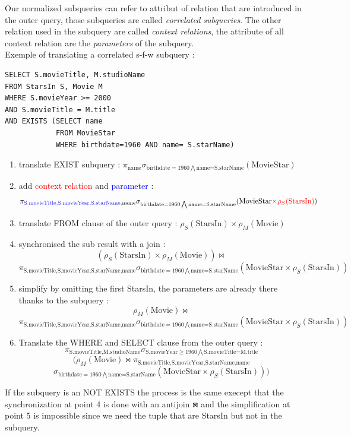 \documentclass[12pt,a4paper]{article}
\def\ojoin{\setbox0=\hbox{$\bowtie$}%
  \llap{\rule[\ht0]{.25em}{.4pt}}}
\def\antijoin{ \ \mathbin{\ojoin\mkern-12.1mu\Join\mkern-7.7mu\ojoin}}
\begin{document}
Our normalized subqueries can refer to attribut of relation that are introduced in the outer query, those subqueries are called \emph{correlated subqueries}. The other relation used in the subquery are called \emph{context relations}, the attribute of all context relation are the \emph{parameters} of the subquery.\\

Exemple of translating a correlated s-f-w subquery :
\begin{verbatim}
SELECT S.movieTitle, M.studioName 
FROM StarsIn S, Movie M 
WHERE S.movieYear >= 2000
AND S.movieTitle = M.title
AND EXISTS (SELECT name
            FROM MovieStar
			WHERE birthdate=1960 AND name= S.starName)
\end{verbatim}

\begin{enumerate}
\item translate EXIST subquery : $\pi_{\text{name}} \sigma_{\text{birthdate}=1960 \bigwedge \text{name=S.starName}} (\text{MovieStar}) $
\item add \textcolor{red}{context relation} and \textcolor{blue}{parameter} : $$\pi_{\text{\textcolor{blue}{S.movieTitle,S.movieYear,S.starName},name}} \sigma_{\text{birthdate}=1960 \bigwedge \text{name=S.starName}} (\text{MovieStar} \textcolor{red}{\times \rho_S(\text{StarsIn})}) $$
\item translate FROM clause of the outer query : $\rho_S(\text{StarsIn}) \times \rho_M(\text{Movie})$
\item synchronised the sub result with a join :
$$(\rho_S(\text{StarsIn}) \times \rho_M(\text{Movie})) \Join$$
$$\pi_{\text{S.movieTitle,S.movieYear,S.starName,name}} \sigma_{\text{birthdate}=1960 \bigwedge \text{name=S.starName}} (\text{MovieStar} \times \rho_S(\text{StarsIn}))$$
\item simplify by omitting the first StarsIn, the parameters are already there thanks to the subquery :
$$\rho_M(\text{Movie}) \Join$$
$$\pi_{\text{S.movieTitle,S.movieYear,S.starName,name}} \sigma_{\text{birthdate}=1960 \bigwedge \text{name=S.starName}} (\text{MovieStar} \times \rho_S(\text{StarsIn}))$$
\item Translate the WHERE and SELECT clause from the outer query :
$$\pi_{\text{S.movieTitle,M.studioName}}\sigma_{\text{S.movieYear}\geqslant1960 \bigwedge \text{S.movieTitle=M.title}}$$
$$(\rho_M(\text{Movie}) \Join \pi_{\text{S.movieTitle,S.movieYear,S.starName,name}}$$
$$\sigma_{\text{birthdate}=1960 \bigwedge \text{name=S.starName}} (\text{MovieStar} \times \rho_S(\text{StarsIn})))$$
\end{enumerate}
If the subquery is an NOT EXISTS the process is the same execept that the synchronization at point 4 is done with an antijoin $\antijoin$ and the simplification at point 5 is impossible since we need the tuple that are StarsIn but not in the subquery.\\
\end{document}
